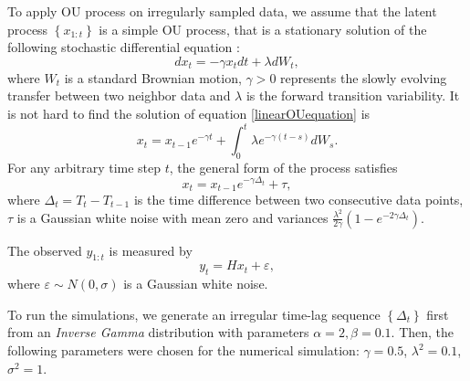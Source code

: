 To apply OU process on irregularly sampled data, we assume that the latent process $\left\lbrace x_{1:t}\right\rbrace$ is a simple OU process, that is a stationary solution of the following stochastic differential equation : 
\begin{equation}\label{linearOUequation}
dx_t= -\gamma x_tdt+\lambda dW_t, 
\end{equation}
where $W_t$ is a standard Brownian motion, $\gamma>0$ represents the slowly evolving transfer between two neighbor data and $\lambda$ is the forward transition variability. It is not hard to find the solution of equation \eqref{linearOUequation} is 
\begin{equation*}
x_t = x_{t-1}e^{-\gamma t} +\int_{0}^{t} \lambda e^{-\gamma (t-s)}dW_s. 
\end{equation*}
For any arbitrary time step $t$, the general form of the process satisfies 
\begin{equation}
x_t = x_{t-1}e^{-\gamma \Delta_t} + \tau,
\end{equation}
where $\Delta_t = T_t-T_{t-1}$ is the time difference between two consecutive data points, $\tau$ is a Gaussian white noise with mean zero and variances $\frac{\lambda^2}{2\gamma}\left(1-e^{-2\gamma\Delta_t}\right)$. 

The observed $y_{1:t}$ is measured by 
\begin{equation}
y_t = Hx_t + \varepsilon,
\end{equation}
where $\varepsilon\sim N(0,\sigma)$ is a Gaussian white noise. 

To run the simulations, we generate an irregular time-lag sequence $\left\lbrace \Delta_t\right\rbrace$ first from an \textit{Inverse Gamma} distribution with parameters $\alpha=2, \beta=0.1$. Then, the following parameters were chosen for the numerical simulation: $\gamma = 0.5$, $\lambda^2 = 0.1$, $\sigma^2=1$. 



